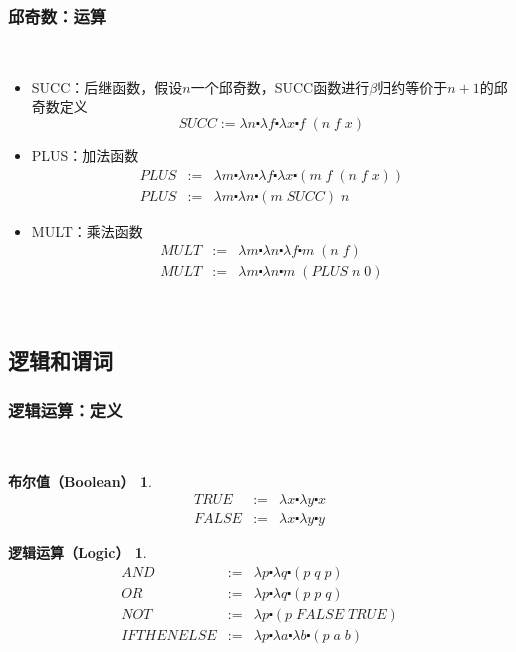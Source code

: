 \documentclass[CJKutf8,compress,hyperref]{beamer}
\begin{document}
\begin{CJK}{UTF8}{song}
\begin{frame}
  \frametitle{邱奇数：运算}　　
  \begin{itemize}
  \item SUCC：后继函数，假设$n$一个邱奇数，SUCC函数进行$\beta$归约等价于$n + 1$的邱奇数定义
    \begin{equation*}
      SUCC := \lambda n \centerdot \lambda f \centerdot \lambda x \centerdot f \; (n \; f \; x) 
    \end{equation*}
  \item PLUS：加法函数
    \begin{eqnarray*}
      PLUS & := & \lambda m \centerdot \lambda n \centerdot \lambda f \centerdot \lambda x \centerdot (m \; f \;(n \;f \; x)) \\ 
      PLUS & := & \lambda m \centerdot \lambda n \centerdot (m \; SUCC) \; n  
    \end{eqnarray*}
  \item MULT：乘法函数　
    \begin{eqnarray*}
      MULT & := & \lambda m \centerdot \lambda n \centerdot \lambda f \centerdot m \; (n \; f) \\ 
      MULT & := & \lambda m \centerdot \lambda n \centerdot m \; (PLUS \; n \;0)  
    \end{eqnarray*}
  \end{itemize}　
\end{frame}

\subsection{逻辑和谓词}
\begin{frame}
  \frametitle{逻辑运算：定义}　
  \newtheorem{boolV}{布尔值（Boolean）}
  \begin{boolV}
    \begin{eqnarray*}
      TRUE  & := & \lambda x \centerdot \lambda y \centerdot x \\
      FALSE & := & \lambda x \centerdot \lambda y \centerdot y 
    \end{eqnarray*} 
  \end{boolV}
  \newtheorem{logicO}{逻辑运算（Logic）} 
  \begin{logicO}
    \begin{eqnarray*}
      AND & := & \lambda p \centerdot \lambda q \centerdot (p \; q \; p) \\
      OR & := & \lambda p \centerdot \lambda q \centerdot (p \; p \; q) \\
      NOT & := & \lambda p \centerdot (p \; FALSE \; TRUE) \\
      IFTHENELSE & := & \lambda p \centerdot \lambda a \centerdot \lambda b \centerdot (p \; a \; b)
    \end{eqnarray*}
  \end{logicO}
\end{frame}


\end{CJK}
\end{document}
